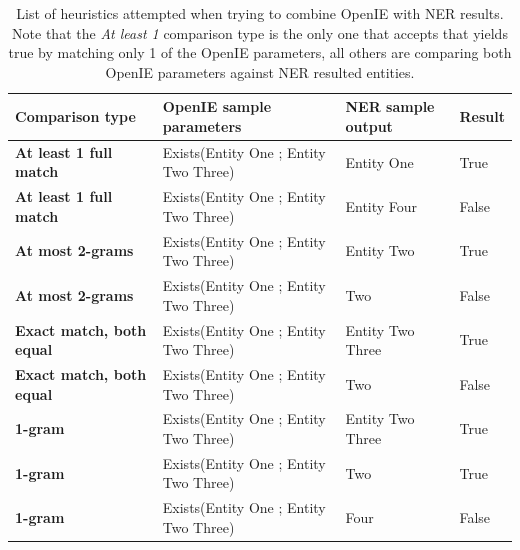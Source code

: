 \documentclass[11pt,a4paper,openright]{memoir}
\begin{document}
\begin{table}[!htbp]
  \centering
  \tiny
    \begin{tabular}{|m{2cm}|m{5cm}|m{2cm}|m{1cm}|}
\hline

\textbf{Comparison type} &
\textbf{OpenIE sample parameters} &
\textbf{NER sample output} &
\textbf{Result} \\
\hline

\textbf{At least 1 full match}  &
Exists(Entity One ; Entity Two Three)  &
Entity One &
True \\
\hline

\textbf{At least 1 full match}  &
Exists(Entity One ; Entity Two Three)  &
Entity Four &
False \\
\hline

\textbf{At most 2-grams}  &
Exists(Entity One ; Entity Two Three)  &
Entity Two &
True \\
\hline

\textbf{At most 2-grams}  &
Exists(Entity One ; Entity Two Three)  &
Two &
False \\
\hline

\textbf{Exact match, both equal}  &
Exists(Entity One ; Entity Two Three)  &
Entity Two Three &
True \\
\hline

\textbf{Exact match, both equal}  &
Exists(Entity One ; Entity Two Three)  &
Two &
False \\
\hline

\textbf{1-gram}  &
Exists(Entity One ; Entity Two Three)  &
Entity Two Three &
True \\
\hline

\textbf{1-gram}  &
Exists(Entity One ; Entity Two Three)  &
Two &
True \\
\hline

\textbf{1-gram}  &
Exists(Entity One ; Entity Two Three)  &
Four &
False \\
\hline

    \end{tabular}
  \caption[List of heuristics attempted when trying to combine OpenIE with NER results.]{List of heuristics attempted when trying to combine OpenIE with NER results. Note that the \emph{At least 1} comparison type is the only one that accepts that yields true by matching only 1 of the OpenIE parameters, all others are comparing both OpenIE parameters against NER resulted entities.}
  \label{tab:ngram_comparison}
\end{table}
\end{document}
